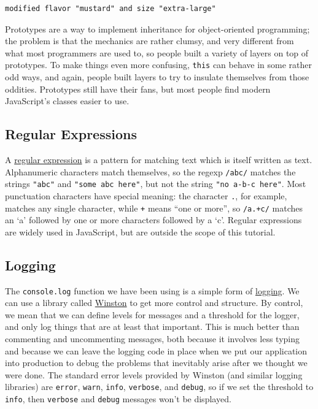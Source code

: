 \begin{verbatim}
modified flavor "mustard" and size "extra-large"
\end{verbatim}

Prototypes are a way to implement inheritance for object-oriented
programming; the problem is that the mechanics are rather clumsy, and
very different from what most programmers are used to, so people built a
variety of layers on top of prototypes. To make things even more
confusing, \texttt{this} can behave in some rather odd ways, and again,
people built layers to try to insulate themselves from those oddities.
Prototypes still have their fans, but most people find modern
JavaScript's classes easier to use.

\subsection{Regular Expressions}\label{s:regexp}

A \protect\hyperlink{g:regular-expression}{regular expression} is a
pattern for matching text which is itself written as text. Alphanumeric
characters match themselves, so the regexp \texttt{/abc/} matches the
strings \texttt{"abc"} and \texttt{"some\ abc\ here"}, but not the
string \texttt{"no\ a-b-c\ here"}. Most punctuation characters have
special meaning: the character \texttt{.}, for example, matches any
single character, while \texttt{+} means ``one or more'', so
\texttt{/a.+c/} matches an `a' followed by one or more characters
followed by a `c'. Regular expressions are widely used in JavaScript,
but are outside the scope of this tutorial.

\hypertarget{s:logging}{\subsection{Logging}\label{s:logging}}

The \texttt{console.log} function we have been using is a simple form of
\protect\hyperlink{g:logging}{logging}. We can use a library called
\href{https://github.com/winstonjs/winston}{Winston} to get more control
and structure. By control, we mean that we can define levels for
messages and a threshold for the logger, and only log things that are at
least that important. This is much better than commenting and
uncommenting messages, both because it involves less typing and because
we can leave the logging code in place when we put our application into
production to debug the problems that inevitably arise after we thought
we were done. The standard error levels provided by Winston (and similar
logging libraries) are
\texttt{\textquotesingle{}error\textquotesingle{}},
\texttt{\textquotesingle{}warn\textquotesingle{}},
\texttt{\textquotesingle{}info\textquotesingle{}},
\texttt{\textquotesingle{}verbose\textquotesingle{}}, and
\texttt{\textquotesingle{}debug\textquotesingle{}}, so if we set the
threshold to \texttt{\textquotesingle{}info\textquotesingle{}}, then
\texttt{\textquotesingle{}verbose\textquotesingle{}} and
\texttt{\textquotesingle{}debug\textquotesingle{}} messages won't be
displayed.

